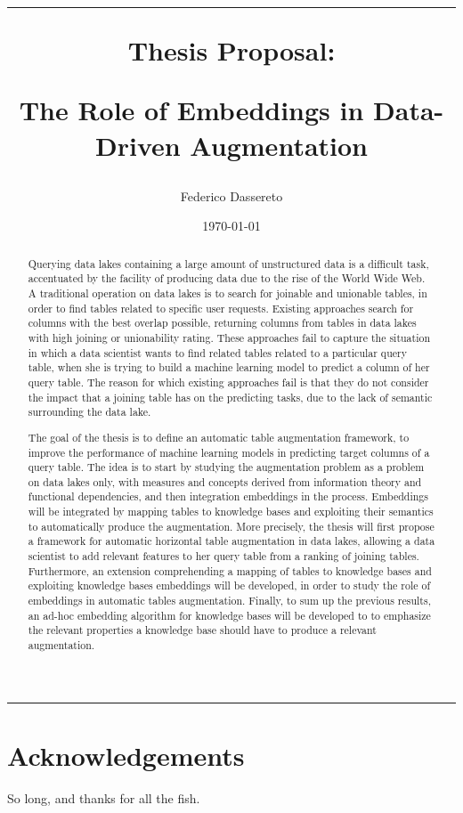 \documentclass[a4paper,11pt, english]{article}
\title{\vspace{0cm}
\hrule
\vspace{1cm}
\centerline{\LARGE{Thesis Proposal:}}
\vspace{0.5cm}
\centerline{\LARGE {\bf The Role of Embeddings in Data-Driven Augmentation}}
}
\author{Federico Dassereto}
\date{\today}
\begin{document}
\maketitle
\hrule 
\vspace{1cm}

\begin{abstract}
    Querying data lakes containing a large amount of unstructured data is a difficult task, accentuated by the facility of producing data due to the rise of the World Wide Web. A traditional operation on data lakes is to search for joinable and unionable tables, in order to find tables related to specific user requests. Existing approaches search for columns with the best overlap possible, returning columns from tables in data lakes with high joining or unionability rating. These approaches fail to capture the situation in which a data scientist wants to find related tables related to a particular query table, when she is trying to build a machine learning model to predict a column of her query table. The reason for which existing approaches fail is that they do not consider the impact that a joining table has on the predicting tasks, due to the lack of semantic surrounding the data lake. 

    The goal of the thesis is to define an automatic table augmentation framework, to improve the performance of machine learning models in predicting target columns of a query table. The idea is to start by studying the augmentation problem as a problem on data lakes only, with measures and concepts derived from information theory and functional dependencies, and then integration embeddings in the process. Embeddings will be integrated by mapping tables to knowledge bases and exploiting their semantics to automatically produce the augmentation. More precisely, the thesis will first propose a framework for automatic horizontal table augmentation in data lakes, allowing a data scientist to add relevant features to her query table from a ranking of joining tables. Furthermore, an extension comprehending a mapping of tables to knowledge bases and exploiting knowledge bases embeddings will be developed, in order to study the role of embeddings in automatic tables augmentation. Finally, to sum up the previous results, an ad-hoc embedding algorithm for knowledge bases will be developed to to emphasize the relevant properties a knowledge base should have to produce a relevant augmentation.
\end{abstract}











\section*{Acknowledgements}{So long, and thanks for all the fish.}



\printbibliography
\end{document}
